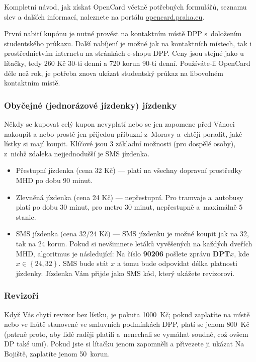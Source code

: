 Kompletní návod, jak získat OpenCard včetně potřebných formulářů, seznamu slev a dalších informací, naleznete na portálu \url{opencard.praha.eu}.

První nabití kupónu je nutné provést na kontaktním místě DPP s~doložením studentského průkazu. Další nabíjení je možné jak na kontaktních místech, tak i prostřednictvím internetu na stránkách e-shopu DPP. Ceny jsou stejné jako u lítačky, tedy 260 Kč 30-ti denní a 720 korun 90-ti denní. Používáte-li OpenCard déle než rok, je potřeba znova ukázat studentský průkaz na libovolném kontaktním místě.


\subsubsection{Obyčejné (jednorázové jízdenky) jízdenky}

Někdy se kupovat celý kupon nevyplatí nebo se jen zapomene před
Vánoci nakoupit a nebo prostě jen přijedou příbuzní z~Moravy
a~chtějí poradit, jaké lístky si mají koupit. Klíčové jsou 3
základní možnosti (pro dospělé osoby), z~nichž zdaleka nejjednodušší je SMS jízdenka.

\begin{itemize}

\item Přestupní jízdenka (cena 32 Kč) --- platí na všechny dopravní
prostředky MHD po dobu 90 minut.

\item Zlevněná jízdenka (cena 24 Kč) --- nepřestupní. Pro tramvaje
a~autobusy platí po dobu 30 minut, pro metro 30 minut, nepřestupně
a~maximálně 5 stanic.

\item SMS jízdenka (cena 32/24 Kč) --- SMS jízdenku je možné koupit jak na 32, tak na 24 korun. Pokud si nevšimnete letáků vyvěšených na každých dveřích MHD, algoritmus je následující: Na číslo {\bf 90206} pošlete zprávu {\bf DPT$x$}, kde $x\in\left\{24, 32\right\}$. SMS bude stát $x$ a tomu bude odpovídat délka platnosti jízdenky. Jízdenka Vám přijde jako SMS kód, který ukážete revizorovi.

\end{itemize}

\subsubsection{Revizoři}

Když Vás chytí revizor bez lístku, je pokuta 1000~Kč; pokud
zaplatíte na místě nebo ve lhůtě stanovené ve smluvních podmínkách
DPP, platí se jenom 800~Kč (patrně proto, aby lidé raději platili
a~nenechali se vymáhat soudně, což ovšem DP také umí). Pokud jste
si lítačku jenom zapomněli a přivezete ji ukázat Na Bojiště,
zaplatíte jenom 50~korun.